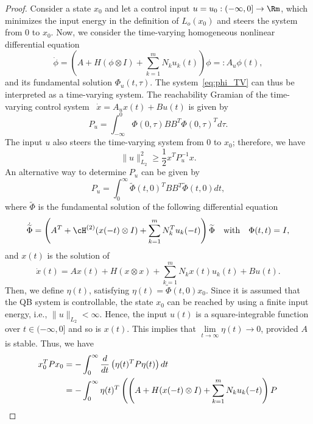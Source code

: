 \begin{proof}
	Consider a state $x_0$ and let a control input $u=u_{0}:(-\infty,0]\rightarrow \Rm$, which minimizes the input energy in the definition of $L_o(x_0)$ and steers the system from $0$ to $x_0$. Now, we consider the time-varying homogeneous nonlinear differential equation
	\begin{equation}\label{eq:phi_TV}
	\dot \phi = \left(A + H(\phi\otimes I) +\sum_{k=1}^mN_ku_k(t) \right) \phi =: A_{u}\phi(t),
	\end{equation}
 and its fundamental solution $\Phi_{u}(t,\tau)$. The system~\eqref{eq:phi_TV} can thus be interpreted as a time-varying system. The reachability Gramian of the time-varying control system~\cite{shokoohi1983linear,verriest1983generalized} $\dot x = A_{u}x(t) + Bu(t)$ is  given by
\begin{equation*}
 P_u = \int_{-\infty}^0\Phi(0,\tau)BB^T\Phi(0,\tau)^Td\tau.
\end{equation*}
The input $u$ also steers the time-varying system from $0$ to $x_0$; therefore, we have
$$\|u\|_{L_2}^2 \geq \dfrac{1}{2}x^TP_u^{-1}x.$$
An alternative way to determine $P_u$ can be given by
\begin{equation*}
 P_u = \int^{\infty}_0\tilde\Phi(t,0)^TBB^T\tilde\Phi(t,0)dt,
\end{equation*}
where $\tilde\Phi$ is the fundamental solution of the following differential equation
 \begin{equation}\label{eq:tildephi_TV}
  \dot {\tilde\Phi} = \left(A^T + \cH^{(2)}(x(-t)\otimes I) +\sum_{k=1}^mN_k^Tu_k(-t) \right) \tilde\Phi~~~ \mbox{with}~~~\Phi(t,t) = I,
 \end{equation}
 and $x(t)$ is the solution of
 $$\dot x(t) = Ax(t) + H(x\otimes x) + \sum_{k=1}^mN_kx(t)u_k(t) + Bu(t).$$
Then, we define $\eta(t)$, satisfying $\eta(t) = \tilde\Phi(t,0)x_0$.  Since it is assumed that the QB system is controllable,  the state $x_0$ can be reached by using a finite input energy, i.e., $\|u\|_{L_2} <\infty$. Hence, the input $u(t)$ is a  square-integrable function over $t \in (-\infty,0]$ and so is $x(t)$. This implies that $\lim\limits_{t\rightarrow\infty}\eta(t) \rightarrow 0$, provided $A$ is stable. Thus, we have
\begin{align*}
 x_0^TPx_0 &= -\int_{0}^\infty \dfrac{d}{dt} \left(\eta(t)^TP\eta(t)\right)dt \allowdisplaybreaks\\
 & =-\int_0^\infty  \eta(t)^T\left( \left(A + H(x(-t)\otimes I) +\sum_{k=1}^mN_ku_k(-t) \right)P  \right. \\

\end{align*}
\end{proof}
